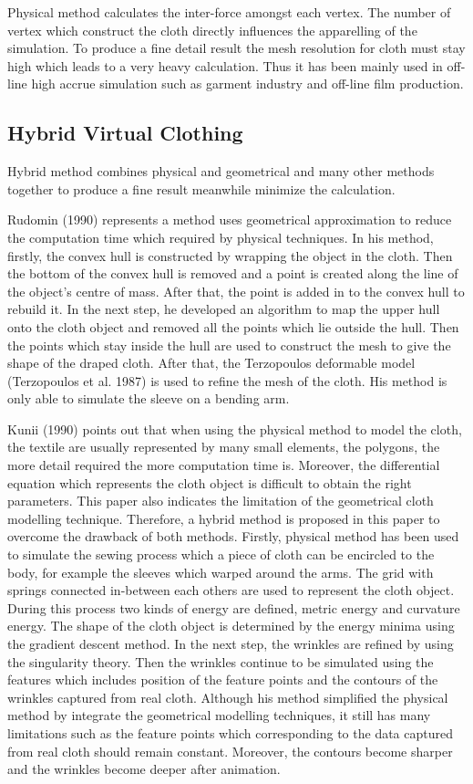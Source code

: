 Physical method calculates the inter-force amongst each vertex. The number of vertex which construct the cloth directly influences the apparelling of the simulation. To produce a fine detail result the mesh resolution for cloth must stay high which leads to a very heavy calculation. Thus it has been mainly used in off-line high accrue simulation such as garment industry and off-line film production. 

\subsection{Hybrid Virtual Clothing}

Hybrid method combines physical and geometrical and many other methods together to produce a fine result meanwhile minimize the calculation. 

Rudomin (1990) represents a method uses geometrical approximation to reduce the computation time which required by physical techniques. In his method, firstly, the convex hull is constructed by wrapping the object in the cloth. Then the bottom of the convex hull is removed and a point is created along the line of the object’s centre of mass. After that, the point is added in to the convex hull to rebuild it. In the next step, he developed an algorithm to map the upper hull onto the cloth object and removed all the points which lie outside the hull. Then the points which stay inside the hull are used to construct the mesh to give the shape of the draped cloth. After that, the Terzopoulos deformable model (Terzopoulos et al. 1987) is used to refine the mesh of the cloth. His method is only able to simulate the sleeve on a bending arm. 

Kunii  (1990) points out that when using the physical method to model the cloth, the textile are usually represented by many small elements, the polygons, the more detail required the more computation time is. Moreover, the differential equation which represents the cloth object is difficult to obtain the right parameters. This paper also indicates the limitation of the geometrical cloth modelling technique. Therefore, a hybrid method is proposed in this paper to overcome the drawback of both methods. Firstly, physical method has been used to simulate the sewing process which a piece of cloth can be encircled to the body, for example the sleeves which warped around the arms. The grid with springs connected in-between each others are used to represent the cloth object. During this process two kinds of energy are defined, metric energy and curvature energy. The shape of the cloth object is determined by the energy minima using the gradient descent method. In the next step, the wrinkles are refined by using the singularity theory. Then the wrinkles continue to be simulated using the features which includes position of the feature points and the contours of the wrinkles captured from real cloth. Although his method simplified the physical method by integrate the geometrical modelling techniques, it still has many limitations such as the feature points which corresponding to the data captured from real cloth should remain constant. Moreover, the contours become sharper and the wrinkles become deeper after animation.


